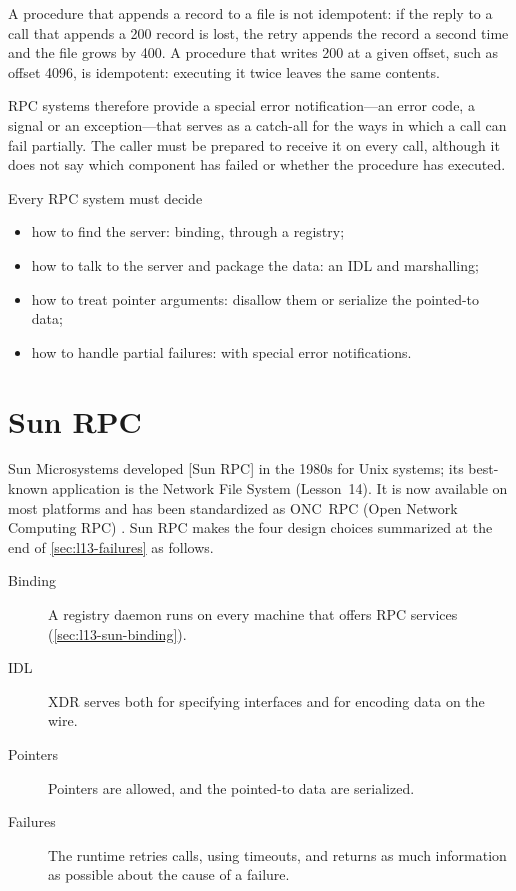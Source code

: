 \documentclass[../main.tex]{subfiles}
\begin{document}
\begin{example}
  A procedure that appends a record to a file is not idempotent: if the
  reply to a call that appends a \SI{200}{\byte} record is lost, the retry
  appends the record a second time and the file grows by \SI{400}{\byte}.
  A procedure that writes \SI{200}{\byte} at a given offset, such as offset
  \num{4096}, is idempotent: executing it twice leaves the same contents.
\end{example}

RPC systems therefore provide a special error notification---an error
code, a signal or an exception---that serves as a catch-all for the ways in
which a call can fail partially.  The caller must be prepared to receive it
on every call, although it does not say which component has failed or
whether the procedure has executed.

\begin{keypoint}
  Every RPC system must decide
  \begin{itemize}
    \item how to find the server: binding, through a registry;
    \item how to talk to the server and package the data: an IDL and
      marshalling;
    \item how to treat pointer arguments: disallow them or serialize the
      pointed-to data;
    \item how to handle partial failures: with special error notifications.
  \end{itemize}
\end{keypoint}

\section{Sun RPC}
\label{sec:l13-sunrpc}

Sun Microsystems developed [Sun RPC] in the 1980s for Unix
systems; its best-known application is the Network File System
(Lesson~14).  It is now
available on most platforms and has been standardized as ONC~RPC
(Open Network Computing RPC) \cite{rfc5531}.
Sun RPC makes the four design choices summarized at the end of
\cref{sec:l13-failures} as follows.
\begin{description}
  \item[Binding] A registry daemon runs on every machine that offers RPC
    services (\cref{sec:l13-sun-binding}).
  \item[IDL] XDR serves both for specifying interfaces and for encoding data
    on the wire.
  \item[Pointers] Pointers are allowed, and the pointed-to data are
    serialized.
  \item[Failures] The runtime retries calls, using timeouts, and returns as
    much information as possible about the cause of a failure.
\end{description}
\end{document}
